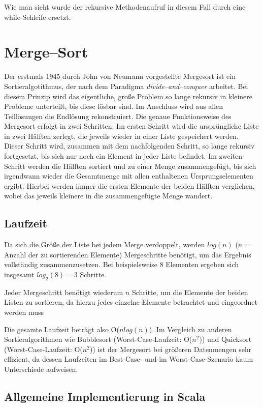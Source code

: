 Wie man sieht wurde der rekursive Methodenaufruf in diesem Fall durch eine while-Schleife ersetzt.


\section{Merge--Sort}
Der erstmals 1945 durch John von Neumann vorgestellte Mergesort ist ein Sortieralgotithmus, der nach dem Paradigma \textit{divide--and--conquer} arbeitet. Bei diesem Prinzip wird das eigentliche, große Problem so lange rekursiv in kleinere Probleme unterteilt, bis diese lösbar sind. Im Anschluss wird aus allen Teillösungen die Endlösung rekonstruiert. Die genaue Funktionsweise des Mergesort erfolgt in zwei Schritten: Im ersten Schritt wird die ursprüngliche Liste in zwei Hälften zerlegt, die jeweils wieder in einer Liste gespeichert werden. Dieser Schritt wird, zusammen mit dem nachfolgenden Schritt, so lange rekursiv fortgesetzt, bis sich nur noch ein Element in jeder Liste befindet. Im zweiten Schritt werden die Hälften sortiert und zu einer Menge zusammengefügt, bis sich irgendwann wieder die Gesamtmenge mit allen enthaltenen Ursprungselementen ergibt. Hierbei werden immer die ersten Elemente der beiden Hälften verglichen, wobei das jeweils kleinere in die zusammengefügte Menge wandert.


\subsection{Laufzeit}

Da sich die Größe der Liste bei jedem Merge verdoppelt, werden $log(n)$ ($n$ = Anzahl der zu sortierenden Elemente) Mergeschritte benötigt, um das Ergebnis vollständig zusammenzusetzen. Bei beispielsweise 8 Elementen ergeben sich insgesamt $log_2 (8) = 3$ Schritte.

Jeder Mergeschritt benötigt wiederum $n$ Schritte, um die Elemente der beiden Listen zu sortieren, da hierzu jedes einzelne Elemente betrachtet und eingeordnet werden muss

Die gesamte Laufzeit beträgt also O($n log (n) $). Im Vergleich zu anderen Sortieralgorithmen wie Bubblesort (Worst-Case-Laufzeit: O($n^2$)) und Quicksort (Worst-Case-Laufzeit: O($n^2$)) ist der Mergesort bei größeren Datenmengen sehr effizient, da dessen Laufzeiten im Best-Case- und im Worst-Case-Szenario kaum Unterschiede aufweisen.

\subsection{Allgemeine Implementierung in Scala}
